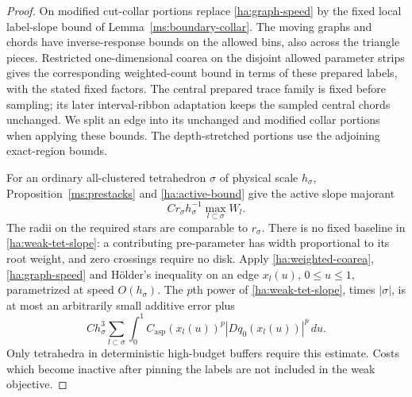 \documentclass[11pt]{article}
\numberwithin{equation}{section}
\theoremstyle{definition}
\theoremstyle{remark}
\begin{document}
\begin{proof}
On modified cut-collar portions replace \eqref{ha:graph-speed} by
the fixed local label-slope bound of
Lemma~\ref{ms:boundary-collar}.  The moving graphs and chords have
inverse-response bounds on the allowed bins, also across the
triangle pieces.  Restricted one-dimensional coarea on the disjoint
allowed parameter strips gives the corresponding weighted-count
bound in terms of these prepared labels, with the stated fixed
factors.  The central prepared trace family is fixed before sampling;
its later interval-ribbon adaptation keeps the sampled central
chords unchanged.  We split an edge into its unchanged and modified
collar portions when applying these bounds.  The depth-stretched
portions use the adjoining exact-region bounds.

For an ordinary all-clustered tetrahedron $\sigma$ of physical scale
$h_\sigma$, Proposition~\ref{ms:prestacks} and
\eqref{ha:active-bound} give the active slope majorant
\begin{equation}\label{ha:weak-tet-slope}
                 C r_\sigma h_\sigma^{-1}
                     \max_{l\subset\sigma}W_l.
\end{equation}
The radii on the required stars are comparable to $r_\sigma$.
There is no fixed baseline in \eqref{ha:weak-tet-slope}: a
contributing pre-parameter has width proportional to its root
weight, and zero crossings require no disk.  Apply
\eqref{ha:weighted-coarea}, \eqref{ha:graph-speed} and H\"older's
inequality on an edge $x_l(u)$, $0\le u\le1$, parametrized at speed
$O(h_\sigma)$.  The $p$th power of
\eqref{ha:weak-tet-slope}, times $|\sigma|$, is at most an arbitrarily
small additive error plus
\begin{equation}\label{ha:edge-power}
 C h_\sigma^3\sum_{l\subset\sigma}
       \int_0^1 C_{\mathrm{asp}}(x_l(u))^p
                    |Dq_0(x_l(u))|^p\,du.
\end{equation}
Only tetrahedra in deterministic high-budget buffers require this
estimate.  Costs which become inactive after pinning the labels are
not included in the weak objective.


\end{proof}
\end{document}
